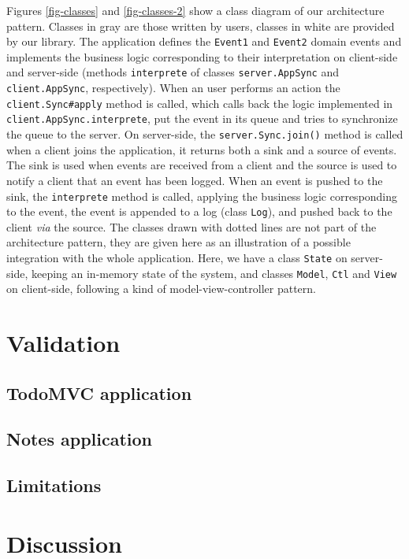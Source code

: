 \documentclass{llncs}
\begin{document}
Figures \ref{fig-classes} and \ref{fig-classes-2} show a class diagram of our architecture pattern. Classes in gray are those written by users, classes in white are provided by our library. The application defines the {\tt Event1} and {\tt Event2} domain events and implements the business logic corresponding to their interpretation on client-side and server-side (methods {\tt interprete} of classes {\tt server.AppSync} and {\tt client.AppSync}, respectively). When an user performs an action the {\tt client.Sync\#apply} method is called, which calls back the logic implemented in {\tt client.AppSync.interprete}, put the event in its queue and tries to synchronize the queue to the server. On server-side, the {\tt server.Sync.join()} method is called when a client joins the application, it returns both a sink and a source of events. The sink is used when events are received from a client and the source is used to notify a client that an event has been logged. When an event is pushed to the sink, the {\tt interprete} method is called, applying the business logic corresponding to the event, the event is appended to a log (class {\tt Log}), and pushed back to the client \emph{via} the source. The classes drawn with dotted lines are not part of the architecture pattern, they are given here as an illustration of a possible integration with the whole application. Here, we have a class {\tt State} on server-side, keeping an in-memory state of the system, and classes {\tt Model}, {\tt Ctl} and {\tt View} on client-side, following a kind of model-view-controller pattern.

\section{Validation}

\subsection{TodoMVC application}

\subsection{Notes application}

\subsection{Limitations}

\section{Discussion}



\end{document}
